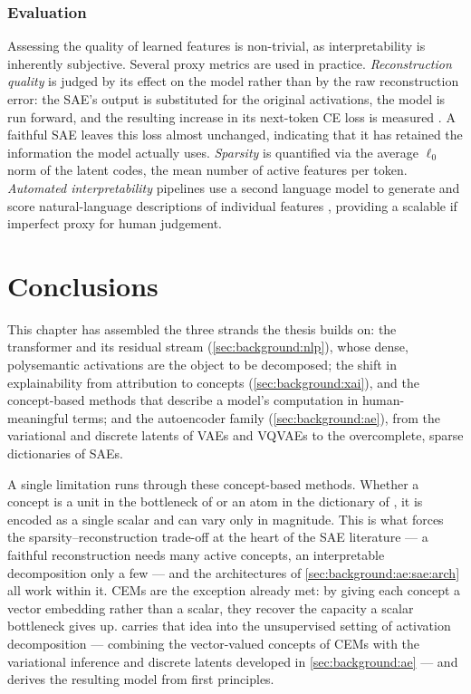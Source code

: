 \subsubsection{Evaluation} \label{sec:background:ae:sae:evaluation}

Assessing the quality of learned features is non-trivial, as interpretability is
inherently subjective. Several proxy metrics are used in practice.
\textit{Reconstruction quality} is judged by its effect on the model rather than
by the raw reconstruction error: the \ac{SAE}'s output is substituted for the
original activations, the model is run forward, and the resulting increase in
its next-token \ac{CE} loss is measured \cite{gaoScalingEvaluatingSparse2024}. A
faithful \ac{SAE} leaves this loss almost unchanged, indicating that it has
retained the information the model actually uses. \textit{Sparsity} is
quantified via the average $\ell_{0}$ norm of the latent codes, \ie the mean
number of active features per token. \textit{Automated interpretability}
pipelines use a second language model to generate and score natural-language
descriptions of individual features \cite{billsLanguageModelsCan2023}, providing
a scalable if imperfect proxy for human judgement.


\section*{Conclusions}

This chapter has assembled the three strands the thesis builds on: the
transformer and its residual stream
(\cref{sec:background:nlp}), whose
dense, polysemantic activations are the object to be decomposed; the shift in
explainability from attribution to concepts
(\cref{sec:background:xai}), and the
concept-based methods that describe a model's computation in human-meaningful
terms; and the autoencoder family
(\cref{sec:background:ae}), from the variational
and discrete latents of \acp{VAE} and \acp{VQVAE} to the overcomplete, sparse
dictionaries of \acp{SAE}.

A single limitation runs through these concept-based methods. Whether a concept
is a unit in the bottleneck of  or an atom in the dictionary of
, it is encoded as a single scalar and can vary only in magnitude. This
is what forces the sparsity--reconstruction trade-off at the heart of the
\ac{SAE} literature --- a faithful reconstruction needs many active concepts, an
interpretable decomposition only a few --- and the architectures of
\cref{sec:background:ae:sae:arch} all
work within it. \Acp{CEM} are the exception already met: by giving each concept
a vector embedding rather than a scalar, they recover the capacity a scalar
bottleneck gives up. 
carries that idea into the unsupervised setting of activation decomposition ---
combining the vector-valued concepts of \acp{CEM} with the variational inference
and discrete latents developed in \cref{sec:background:ae}
--- and derives the resulting model from first principles.



